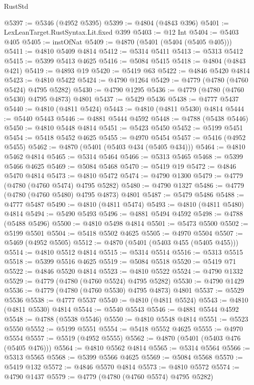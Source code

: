 \begin{lexlean}{RustStd}
\begin{coremodule}
@5397 := @5346 (@4952 @5395)
@5399 := @4804 (@4843 @396)
@5401 := LexLeanTarget.RustSyntax.Lit.fixed @399
@5403 := @12 Int
@5404 := @5403 @405
@5405 := instOfNat
@5409 := @4870 (@5401 (@5404 (@5405 @405)))
@5411 := @4810 @5409 @4814
@5412 := @5314 @5411
@5413 := @5313 @5412
@5415 := @5399 @5413 @4625
@5416 := @5084 @5415
@5418 := @4804 (@4843 @421)
@5419 := @4893 @19
@5420 := @5419 @63
@5422 := @4846 @5420 @4814
@5423 := @4810 @5422
@5424 := @4790 @1264
@5429 := @4779 (@4780 (@4760 @5424) @4795 @5282)
@5430 := @4790 @1295
@5436 := @4779 (@4780 (@4760 @5430) @4795 @4873) @4801
@5437 := @5429 @5436
@5438 := @4777 @5437
@5440 := @4810 (@4811 @5424)
@5443 := @4810 (@4811 @5430) @4814
@5444 := @5440 @5443
@5446 := @4881 @5444 @4592
@5448 := @4788 (@5438 @5446)
@5450 := @4810 @5448 @4814
@5451 := @5423 @5450
@5452 := @5199 @5451
@5454 := @5418 @5452 @4625
@5455 := @4970 @5454
@5457 := @5416 (@4952 @5455)
@5462 := @4870 (@5401 (@5403 @434 (@5405 @434)))
@5464 := @4810 @5462 @4814
@5465 := @5314 @5464
@5466 := @5313 @5465
@5468 := @5399 @5466 @4625
@5469 := @5084 @5468
@5470 := @5419 @19
@5472 := @4846 @5470 @4814
@5473 := @4810 @5472
@5474 := @4790 @1300
@5479 := @4779 (@4780 (@4760 @5474) @4795 @5282)
@5480 := @4790 @1327
@5486 := @4779 (@4780 (@4760 @5480) @4795 @4873) @4801
@5487 := @5479 @5486
@5488 := @4777 @5487
@5490 := @4810 (@4811 @5474)
@5493 := @4810 (@4811 @5480) @4814
@5494 := @5490 @5493
@5496 := @4881 @5494 @4592
@5498 := @4788 (@5488 @5496)
@5500 := @4810 @5498 @4814
@5501 := @5473 @5500
@5502 := @5199 @5501
@5504 := @5418 @5502 @4625
@5505 := @4970 @5504
@5507 := @5469 (@4952 @5505)
@5512 := @4870 (@5401 (@5403 @455 (@5405 @455)))
@5514 := @4810 @5512 @4814
@5515 := @5314 @5514
@5516 := @5313 @5515
@5518 := @5399 @5516 @4625
@5519 := @5084 @5518
@5520 := @5419 @71
@5522 := @4846 @5520 @4814
@5523 := @4810 @5522
@5524 := @4790 @1332
@5529 := @4779 (@4780 (@4760 @5524) @4795 @5282)
@5530 := @4790 @1429
@5536 := @4779 (@4780 (@4760 @5530) @4795 @4873) @4801
@5537 := @5529 @5536
@5538 := @4777 @5537
@5540 := @4810 (@4811 @5524)
@5543 := @4810 (@4811 @5530) @4814
@5544 := @5540 @5543
@5546 := @4881 @5544 @4592
@5548 := @4788 (@5538 @5546)
@5550 := @4810 @5548 @4814
@5551 := @5523 @5550
@5552 := @5199 @5551
@5554 := @5418 @5552 @4625
@5555 := @4970 @5554
@5557 := @5519 (@4952 @5555)
@5562 := @4870 (@5401 (@5403 @476 (@5405 @476)))
@5564 := @4810 @5562 @4814
@5565 := @5314 @5564
@5566 := @5313 @5565
@5568 := @5399 @5566 @4625
@5569 := @5084 @5568
@5570 := @5419 @132
@5572 := @4846 @5570 @4814
@5573 := @4810 @5572
@5574 := @4790 @1437
@5579 := @4779 (@4780 (@4760 @5574) @4795 @5282)

\end{coremodule}
\end{lexlean}
